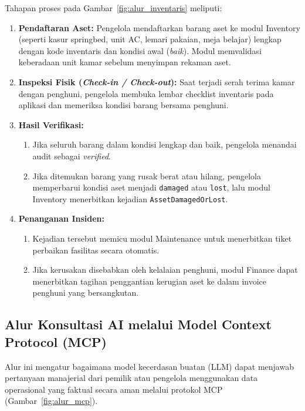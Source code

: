 Tahapan proses pada Gambar~\ref{fig:alur_inventaris} meliputi:
\begin{enumerate}[label=\arabic*., leftmargin=*]
  \item \textbf{Pendaftaran Aset:} Pengelola mendaftarkan barang aset ke modul Inventory (seperti kasur springbed, unit AC, lemari pakaian, meja belajar) lengkap dengan kode inventaris dan kondisi awal (\textit{baik}). Modul memvalidasi keberadaan unit kamar sebelum menyimpan rekaman aset.
  \item \textbf{Inspeksi Fisik (\textit{Check-in / Check-out}):} Saat terjadi serah terima kamar dengan penghuni, pengelola membuka lembar checklist inventaris pada aplikasi dan memeriksa kondisi barang bersama penghuni.
  \item \textbf{Hasil Verifikasi:}
    \begin{enumerate}[label=\alph*., leftmargin=*]
      \item Jika seluruh barang dalam kondisi lengkap dan baik, pengelola menandai audit sebagai \textit{verified}.
      \item Jika ditemukan barang yang rusak berat atau hilang, pengelola memperbarui kondisi aset menjadi \texttt{damaged} atau \texttt{lost}, lalu modul Inventory menerbitkan kejadian \texttt{AssetDamagedOrLost}.
    \end{enumerate}
  \item \textbf{Penanganan Insiden:}
    \begin{enumerate}[label=\alph*., leftmargin=*]
      \item Kejadian tersebut memicu modul Maintenance untuk menerbitkan tiket perbaikan fasilitas secara otomatis.
      \item Jika kerusakan disebabkan oleh kelalaian penghuni, modul Finance dapat menerbitkan tagihan penggantian kerugian aset ke dalam invoice penghuni yang bersangkutan.
    \end{enumerate}
\end{enumerate}

\subsection{Alur Konsultasi AI melalui Model Context Protocol (MCP)}

Alur ini mengatur bagaimana model kecerdasan buatan (LLM) dapat menjawab pertanyaan manajerial dari pemilik atau pengelola menggunakan data operasional yang faktual secara aman melalui protokol MCP (Gambar~\ref{fig:alur_mcp}).

